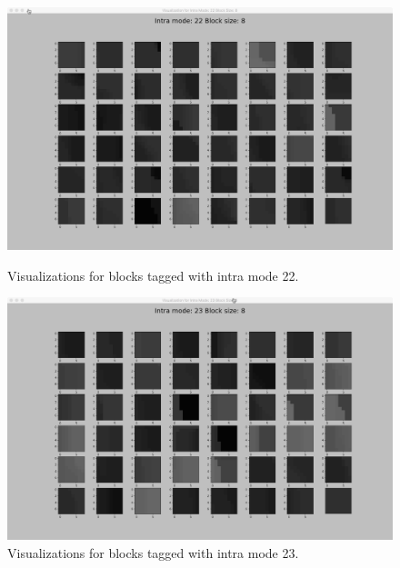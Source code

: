     \begin{figure}
    
        \vspace*{1cm} %
    
        \begin{minipage}{0.49\textwidth}
            \includegraphics[width=\linewidth]{Figures/visu-size8x8/8-22}
            \caption[Visualizations for blocks tagged with intra mode 22]{Visualizations for blocks tagged with intra mode 22.}
            \label{fig:size8_mode22}
        \end{minipage}
        \hspace{\fill} %
        \begin{minipage}{0.49\textwidth}
            \includegraphics[width=\linewidth]{Figures/visu-size8x8/8-23}
            \caption[Visualizations for blocks tagged with intra mode 23]{Visualizations for blocks tagged with intra mode 23.}
            \label{fig:size8_mode23}
        \end{minipage}
    

\end{figure}
